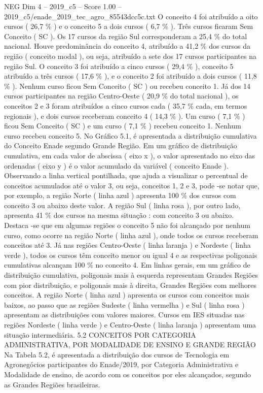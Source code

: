 \begin{textsample}{NEG Dim 4 – 2019\_c5 – Score 1.00 – 2019\_c5/enade\_2019\_tec\_agro\_85543dcc5c.txt}
O conceito 4 foi atribuído a oito cursos ( 26,7 \% ) e o conceito 5 a dois cursos ( 6,7 \% ).
Três cursos ficaram Sem Conceito ( SC ).
Os 17 cursos da região Sul corresponderam a 25,4 \% do total nacional.
Houve predominância do conceito 4, atribuído a 41,2 \% dos cursos da região ( conceito modal ), ou seja, atribuído a sete dos 17 cursos participantes na região Sul.
O conceito 3 foi atribuído a cinco cursos ( 29,4 \% ), conceito 5 atribuído a três cursos ( 17,6 \% ), e o conceito 2 foi atribuído a dois cursos ( 11,8 \% ).
Nenhum curso ficou Sem Conceito ( SC ) ou recebeu conceito 1.
Já dos 14 cursos participantes na região Centro-Oeste ( 20,9 \% do total nacional ), os conceitos 2 e 3 foram atribuídos a cinco cursos cada ( 35,7 \% cada, em termos regionais ), e dois cursos receberam conceito 4 ( 14,3 \% ).
Um curso ( 7,1 \% ) ficou Sem Conceito ( SC ) e um curso ( 7,1 \% ) recebeu conceito 1.
Nenhum curso recebeu conceito 5.
No Gráfico 5.1, é apresentada a distribuição cumulativa do Conceito Enade segundo Grande Região.
Em um gráfico de distribuição cumulativa, em cada valor de abscissa ( eixo x ), o valor apresentado no eixo das ordenadas ( eixo y ) é o valor acumulado da variável ( conceito Enade ).
Observando a linha vertical pontilhada, que ajuda a visualizar o percentual de conceitos acumulados até o valor 3, ou seja, conceitos 1, 2 e 3, pode -se notar que, por exemplo, a região Norte ( linha azul ) apresenta 100 \% dos cursos com conceito 3 ou abaixo deste valor.
A região Sul ( linha rosa ), por outro lado, apresenta 41 \% dos cursos na mesma situação : com conceito 3 ou abaixo.
Destaca -se que em algumas regiões o conceito 5 não foi alcançado por nenhum curso, como ocorre na região Norte ( linha azul ), onde todos os cursos receberam conceitos até 3.
Já nas regiões Centro-Oeste ( linha laranja ) e Nordeste ( linha verde ), todos os cursos têm conceito menor ou igual 4 e as respectivas poligonais cumulativas alcançam 100 \% no conceito 4.
Em linhas gerais, em um gráfico de distribuição cumulativa, poligonais mais à esquerda representam Grandes Regiões com pior distribuição, e poligonais mais à direita, Grandes Regiões com melhores conceitos.
A região Norte ( linha azul ) apresenta os cursos com conceitos mais baixos, ao passo que as regiões Sudeste ( linha vermelha ) e Sul ( linha rosa ) apresentam as distribuições com valores maiores.
Cursos em IES situadas nas regiões Nordeste ( linha verde ) e Centro-Oeste ( linha laranja ) apresentam uma situação intermediária. 5.2 CONCEITOS POR CATEGORIA ADMINISTRATIVA, POR MODALIDADE DE ENSINO E GRANDE REGIÃO Na Tabela 5.2, é apresentada a distribuição dos cursos de Tecnologia em Agronegócios participantes do Enade/2019, por Categoria Administrativa e Modalidade de ensino, de acordo com os conceitos por eles alcançados, segundo as Grandes Regiões brasileiras.

\end{textsample}
